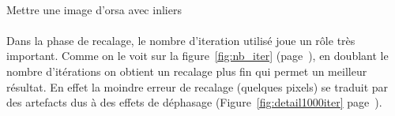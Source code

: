 \documentclass[a4paper,10pt]{report}
\begin{document}
\paragraph{}
Mettre une image d'orsa avec inliers

\paragraph{}
Dans la phase de recalage, le nombre d'iteration utilisé joue un rôle très important. Comme on le voit sur 
la figure~\ref{fig:nb_iter} (page~\pageref{fig:nb_iter}), en doublant le nombre d'itérations on obtient un 
recalage plus fin qui permet un meilleur résultat. En effet la moindre erreur de recalage (quelques pixels) 
se traduit par des artefacts dus à des effets de déphasage (Figure~\ref{fig:detail1000iter} page~\pageref{fig:1000iter}). 
\end{document}
